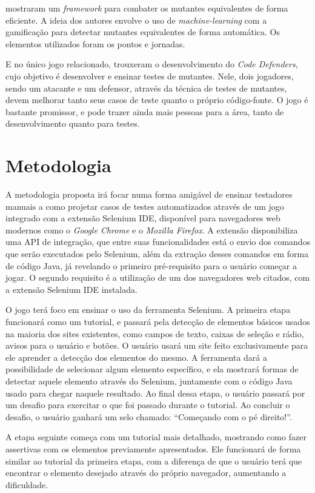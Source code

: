 \documentclass[twoside,english,brazilian]{UNISINOSartigo}
\begin{document}
\cite{Houshmand} mostraram um \textit{framework} para combater os mutantes equivalentes de forma eficiente. A ideia dos autores envolve o uso de \textit{machine-learning} com a gamificação para detectar mutantes equivalentes de forma automática. Os elementos utilizados foram os pontos e jornadas.

E no único jogo relacionado, \cite{Rojas} trouxeram o desenvolvimento do \textit{Code Defenders}, cujo objetivo é desenvolver e ensinar testes de mutantes. Nele, dois jogadores, sendo um atacante e um defensor, através da técnica de testes de mutantes, devem melhorar tanto seus casos de teste quanto o próprio código-fonte. O jogo é bastante promissor, e pode trazer ainda mais pessoas para a área, tanto de desenvolvimento quanto para testes. 


\section{Metodologia}

A metodologia proposta irá focar numa forma amigável de ensinar testadores manuais a como projetar casos de testes automatizados através de um jogo integrado com a extensão Selenium IDE, disponível para navegadores web modernos como o \textit{Google Chrome} e o \textit{Mozilla Firefox}. A extensão disponibiliza uma API de integração, que entre suas funcionalidades está o envio dos comandos que serão executados pelo Selenium, além da extração desses comandos em forma de código Java, já revelando o primeiro pré-requisito para o usuário começar a jogar. O segundo requisito é a utilização de um dos navegadores web citados, com a extensão Selenium IDE instalada. 

O jogo terá foco em ensinar o uso da ferramenta Selenium. A primeira etapa funcionará como um tutorial, e passará pela detecção de elementos básicos usados na maioria dos sites existentes, como campos de texto, caixas de seleção e rádio, avisos para o usuário e botões. O usuário usará um site feito exclusivamente para ele aprender a detecção dos elementos do mesmo. A ferramenta dará a possibilidade de selecionar algum elemento específico, e ela mostrará formas de detectar aquele elemento através do Selenium, juntamente com o código Java usado para chegar naquele resultado. Ao final dessa etapa, o usuário passará por um desafio para exercitar o que foi passado durante o tutorial. Ao concluir o desafio, o usuário ganhará um selo chamado: ``Começando com o pé direito!''. 

A etapa seguinte começa com um tutorial mais detalhado, mostrando como fazer assertivas com os elementos previamente apresentados. Ele funcionará de forma similar ao tutorial da primeira etapa, com a diferença de que o usuário terá que encontrar o elemento desejado através do próprio navegador, aumentando a dificuldade.
\end{document}
